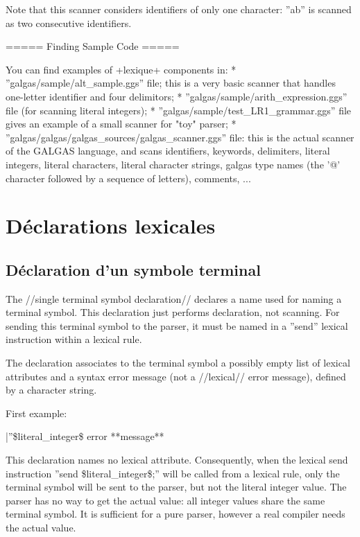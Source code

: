 Note that this scanner considers identifiers of only one character: ''ab'' is scanned as two consecutive identifiers.

===== Finding Sample Code =====

You can find examples of \ggst+lexique+ components in:
  * ''galgas/sample/alt\_sample.ggs'' file; this is a very basic scanner that handles one-letter identifier and four delimitors;
  * ''galgas/sample/arith\_expression.ggs'' file (for scanning literal integers);
  * ''galgas/sample/test\_LR1\_grammar.ggs'' file gives an example of a small scanner for "toy" parser;
  * ''galgas/galgas/galgas\_sources/galgas\_scanner.ggs'' file: this is the actual scanner of the GALGAS language, and scans identifiers, keywords, delimiters, literal integers, literal characters, literal character strings, galgas type names (the '@' character followed by a sequence of letters), comments, ...

\section{Déclarations lexicales}

\subsection{Déclaration d'un symbole terminal}

The //single terminal symbol declaration// declares a name used for naming a terminal symbol. This declaration just performs declaration, not scanning. For sending this terminal symbol to the parser, it must be named in a ''send'' lexical instruction within a lexical rule.

The declaration associates to the terminal symbol a possibly empty list of lexical attributes and a syntax error message (not a //lexical// error message), defined by a character string.

First example:

|''\$literal\_integer\$ error **message** %

This declaration names no lexical attribute. Consequently, when the lexical send instruction ''send \$literal\_integer\$;'' will be called from a lexical rule, only the terminal symbol will be sent to the parser, but not the literal integer value. The parser has no way to get the actual value: all integer values share the same terminal symbol. It is sufficient for a pure parser, however a real compiler needs the actual value.

